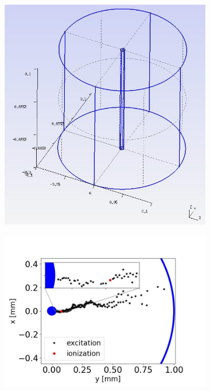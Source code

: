 \begin{figure}[!htbp]
	\centering
	\begin{subfigure}[b]{0.45\textwidth}
		\centering
		\includegraphics[width=\figurewidth,clip,trim={0 0 0 0}]{Figures/GasTest/GarfieldResults/SingleWireGeoPlus.jpg}
		\caption{}
		\label{fig:electron multiplication sim geo}
	\end{subfigure}
	\par\bigskip
	\begin{subfigure}[b]{\figurewidth}
		\centering
		\includegraphics[width=\halfwidth,clip,trim={20 0 70 0}]{Figures/GasTest/GarfieldResults/GarOneEvent100.jpg}

\end{subfigure}
\end{figure}
